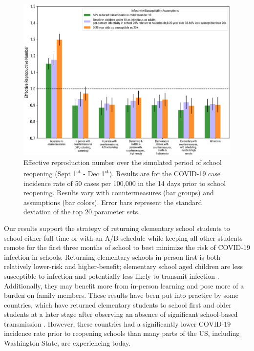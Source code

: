 \documentclass[9pt,twocolumn,twoside,lineno]{pnas-new}
\begin{document}
\begin{figure}[t]
    \centering
    \includegraphics[width=\linewidth]{r_eff_2020-08-13_trim_notitle.png}
    \caption{Effective reproduction number over the simulated period of school reopening (Sept 1\textsuperscript{st} - Dec 1\textsuperscript{st}).  Results are for the COVID-19 case incidence rate of 50 cases per 100,000 in the 14 days prior to school reopening. Results vary with countermeasures (bar groups) and assumptions (bar colors). Error bars represent the standard deviation of the top 20 parameter sets.}
    \label{fig:reff}
\end{figure}

Our results support the strategy of returning elementary school students to school either full-time or with an A/B schedule while keeping all other students remote for the first three months of school to best minimize the risk of COVID-19 infection in schools. Returning elementary schools in-person first is both relatively lower-risk and higher-benefit; elementary school aged children are less susceptible to infection \cite{zhang_changes_2020} and potentially less likely to transmit infection \cite{park_early_nodate, munday2020implications}. Additionally, they may benefit more from in-person learning and pose more of a burden on family members. These results have been put into practice by some countries, which have returned elementary students to school first and older students at a later stage after observing an absence of significant school-based transmission \cite{zhang_changes_2020, auger_association_2020}. However, these countries had a significantly lower COVID-19 incidence rate prior to reopening schools than many parts of the US, including Washington State, are experiencing today.
\end{document}
